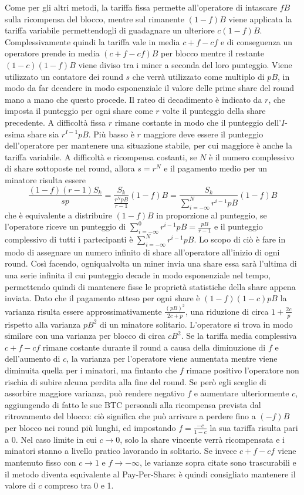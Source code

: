Come per gli altri metodi, la tariffa fissa permette all'operatore di intascare $fB$ sulla ricompensa del blocco, mentre sul rimanente $(1-f)B$ viene applicata la tariffa variabile permettendogli di guadagnare un ulteriore $c(1-f)B$. Complessivamente quindi la tariffa vale in media $c + f -cf$ e di conseguenza un operatore prende in media $(c+f-cf)B$  per blocco mentre il restante $(1-c)(1-f)B$ viene diviso tra i miner a seconda del loro punteggio.
Viene utilizzato un contatore dei round $s$ che verrà utilizzato come multiplo di $pB$, in modo da far decadere in modo esponenziale il valore delle prime share del round mano a mano che questo procede.
Il rateo di decadimento è indicato da $r$, che imposta il punteggio per ogni share come $r$ volte il punteggio della share precedente. A difficoltà fissa $r$ rimane costante in modo che il punteggio dell'$I$-esima share sia $r^{I-1}pB$. Più basso è $r$ maggiore deve essere il punteggio dell'operatore per mantenere una situazione stabile, per cui maggiore è anche la tariffa variabile.
A difficoltà e ricompensa costanti, se $N$ è il numero complessivo di share sottoposte nel round, allora $s=r^N$ e il pagamento medio per un minatore risulta essere
\[ \frac{(1-f)(r-1)S_k}{sp} = \frac{S_k}{\frac{r^N pB}{r-1}}(1-f)B = \frac{S_k}{\sum^N_{i=-\infty}r^{i-1}pB}(1-f)B \]
che è equivalente a distribuire $(1-f)B$ in proporzione al punteggio, se l'operatore riceve un punteggio di $\sum^0_{i=-\infty}r^{i-1}pB = \frac{pB}{r-1}$ e il punteggio complessivo di tutti i partecipanti è $\sum^N_{i=-\infty}r^{i-1}pB$.
Lo scopo di ciò è fare in modo di assegnare un numero infinito di share all'operatore all'inizio di ogni round. Così facendo, ogniqualvolta un miner invia una share essa sarà l'ultima di una serie infinita il cui punteggio decade in modo esponenziale nel tempo, permettendo quindi di mantenere fisse le proprietà statistiche della share appena inviata.
Dato che il pagamento atteso per ogni share è $(1-f)(1-c)pB$ la varianza risulta essere approssimativamente $\frac{(pB)^2}{2c+p}$, una riduzione di circa $1+\frac{2c}{p}$ rispetto alla varianza $pB^2$ di un minatore solitario. L'operatore si trova in modo similare con una varianza per blocco di circa $cB^2$.
Se la tariffa media complessiva $c+f-cf$ rimane costante durante il round a causa della diminuzione di $f$ e dell'aumento di $c$, la varianza per l'operatore viene aumentata mentre viene diminuita quella per i minatori, ma fintanto che $f$ rimane positivo l'operatore non rischia di subire alcuna perdita alla fine del round. Se però egli sceglie di assorbire maggiore varianza, può rendere negativo $f$ e aumentare ulteriormente $c$, aggiungendo di fatto le sue BTC personali alla ricompensa prevista dal ritrovamento del blocco: ciò significa che può arrivare a perdere fino a $(-f)B$ per blocco nei round più lunghi, ed impostando $f=\frac{-c}{1-c}$ la sua tariffa risulta pari a 0.
Nel caso limite in cui $c \rightarrow 0$, solo la share vincente verrà ricompensata e i minatori stanno a livello pratico lavorando in solitario.
Se invece $c+f-cf$ viene mantenuto fisso con $c \rightarrow 1$ e $f \rightarrow -\infty$, le varianze sopra citate sono trascurabili e il metodo diventa equivalente al Pay-Per-Share: è quindi consigliato mantenere il valore di $c$ compreso tra 0 e 1.

